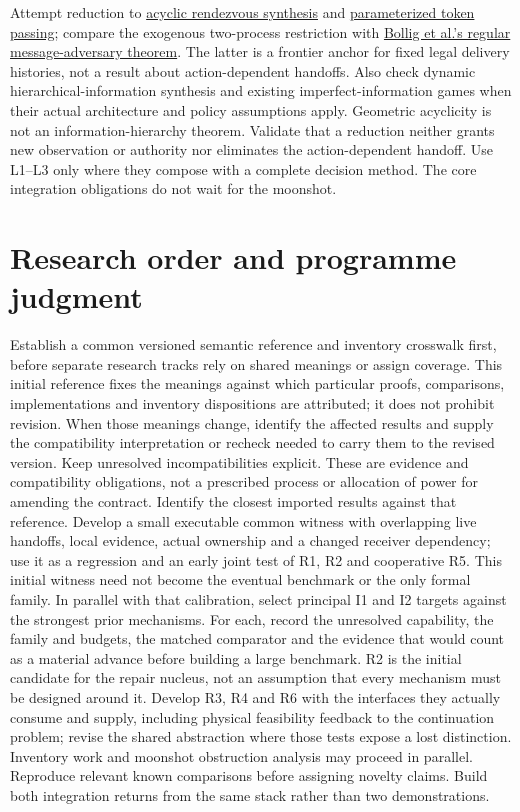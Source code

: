 \documentclass[11pt]{article}
\begin{document}
Attempt reduction to \href{https://doi.org/10.4230/LIPIcs.FSTTCS.2014.639}{acyclic rendezvous synthesis} and \href{https://lmcs.episciences.org/736}{parameterized token passing}; compare the exogenous two-process restriction with \href{https://arxiv.org/html/2611.04561v1\#S1.SS1}{Bollig et al.'s regular message-adversary theorem}. The latter is a frontier anchor for fixed legal delivery histories, not a result about action-dependent handoffs. Also check dynamic hierarchical-information synthesis and existing imperfect-information games when their actual architecture and policy assumptions apply. Geometric acyclicity is not an information-hierarchy theorem. Validate that a reduction neither grants new observation or authority nor eliminates the action-dependent handoff. Use L1--L3 only where they compose with a complete decision method. The core integration obligations do not wait for the moonshot.

\section{Research order and programme judgment}\label{sec:order}
Establish a common versioned semantic reference and inventory crosswalk first, before separate research tracks rely on shared meanings or assign coverage. This initial reference fixes the meanings against which particular proofs, comparisons, implementations and inventory dispositions are attributed; it does not prohibit revision. When those meanings change, identify the affected results and supply the compatibility interpretation or recheck needed to carry them to the revised version. Keep unresolved incompatibilities explicit. These are evidence and compatibility obligations, not a prescribed process or allocation of power for amending the contract. Identify the closest imported results against that reference. Develop a small executable common witness with overlapping live handoffs, local evidence, actual ownership and a changed receiver dependency; use it as a regression and an early joint test of R1, R2 and cooperative R5. This initial witness need not become the eventual benchmark or the only formal family. In parallel with that calibration, select principal I1 and I2 targets against the strongest prior mechanisms. For each, record the unresolved capability, the family and budgets, the matched comparator and the evidence that would count as a material advance before building a large benchmark. R2 is the initial candidate for the repair nucleus, not an assumption that every mechanism must be designed around it. Develop R3, R4 and R6 with the interfaces they actually consume and supply, including physical feasibility feedback to the continuation problem; revise the shared abstraction where those tests expose a lost distinction. Inventory work and moonshot obstruction analysis may proceed in parallel. Reproduce relevant known comparisons before assigning novelty claims. Build both integration returns from the same stack rather than two demonstrations.
\end{document}
